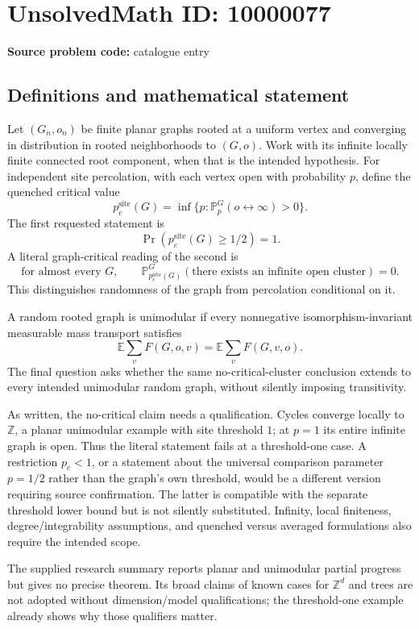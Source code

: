 \documentclass[11pt]{article}
\newcommand{\Z}{\mathbb{Z}}
\begin{document}
\section*{UnsolvedMath ID: 10000077}
\textbf{Source problem code:} catalogue entry
\subsection{Definitions and mathematical statement}
Let \((G_n,o_n)\) be finite planar graphs rooted at a uniform vertex and converging in distribution in rooted neighborhoods to \((G,o)\). Work with its infinite locally finite connected root component, when that is the intended hypothesis. For independent site percolation, with each vertex open with probability \(p\), define the quenched critical value
\[
p_c^{\mathrm{site}}(G)=\inf\{p:\mathbb P_p^G(o\leftrightarrow\infty)>0\}.
\]
The first requested statement is
\[
\Pr(p_c^{\mathrm{site}}(G)\ge1/2)=1.
\]
A literal graph-critical reading of the second is
\[
\text{for almost every }G,\qquad
\mathbb P_{p_c^{\mathrm{site}}(G)}^G
(\text{there exists an infinite open cluster})=0.
\]
This distinguishes randomness of the graph from percolation conditional on it.

A random rooted graph is unimodular if every nonnegative isomorphism-invariant measurable mass transport satisfies
\[
\mathbb E\sum_v F(G,o,v)=\mathbb E\sum_v F(G,v,o).
\]
The final question asks whether the same no-critical-cluster conclusion extends to every intended unimodular random graph, without silently imposing transitivity.

As written, the no-critical claim needs a qualification. Cycles converge locally to \(\Z\), a planar unimodular example with site threshold \(1\); at \(p=1\) its entire infinite graph is open. Thus the literal statement fails at a threshold-one case. A restriction \(p_c<1\), or a statement about the universal comparison parameter \(p=1/2\) rather than the graph's own threshold, would be a different version requiring source confirmation. The latter is compatible with the separate threshold lower bound but is not silently substituted. Infinity, local finiteness, degree/integrability assumptions, and quenched versus averaged formulations also require the intended scope.

The supplied research summary reports planar and unimodular partial progress but gives no precise theorem. Its broad claims of known cases for \(\Z^d\) and trees are not adopted without dimension/model qualifications; the threshold-one example already shows why those qualifiers matter.
\end{document}

